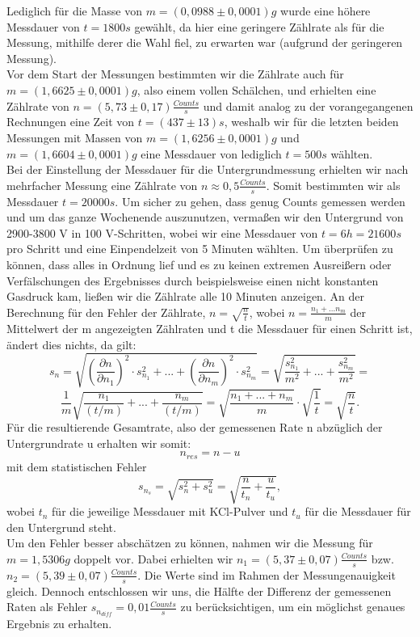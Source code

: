 Lediglich für die Masse von $m=(0,0988\pm0,0001)g$ wurde eine höhere Messdauer von $t=1800 s$ gewählt, da hier eine geringere Zählrate als für die Messung, mithilfe derer die Wahl fiel, zu erwarten war (aufgrund der geringeren Messung). \\
Vor dem Start der Messungen bestimmten wir die Zählrate auch für $m=(1,6625\pm0,0001)g$, also einem vollen Schälchen, und erhielten  eine Zählrate von $n=(5,73\pm0,17)\frac{Counts}{s}$ und damit analog zu der vorangegangenen Rechnungen eine Zeit von $t=(437\pm13)s$, weshalb wir für die letzten beiden Messungen mit Massen von $m=(1,6256\pm0,0001)g$ und $m=(1,6604\pm0,0001)g$ eine Messdauer von lediglich $t=500s$ wählten. \\
Bei der Einstellung der Messdauer für die Untergrundmessung erhielten wir nach mehrfacher Messung eine Zählrate von $n\approx 0,5 \frac{Counts}{s}$. Somit bestimmten wir als Messdauer $t=20000s$. Um sicher zu gehen, dass genug Counts gemessen werden und um das ganze Wochenende auszunutzen, vermaßen wir den Untergrund von 2900-3800 V in 100 V-Schritten, wobei wir eine Messdauer von $t=6h=21600s$ pro Schritt und eine Einpendelzeit von 5 Minuten wählten. Um überprüfen zu können, dass alles in Ordnung lief und es zu keinen extremen Ausreißern oder Verfälschungen des Ergebnisses durch beispielsweise einen nicht konstanten Gasdruck kam, ließen wir die Zählrate alle 10 Minuten anzeigen. An der Berechnung für den Fehler der Zählrate, $n=\sqrt{\frac{n}{t}}$, wobei $n=\frac{n_{1}+...n_{m}}{m}$ der Mittelwert der m angezeigten Zählraten und t die Messdauer für einen Schritt ist, ändert dies nichts, da gilt:
 \[s_{n}=\sqrt{(\frac{\partial n}{\partial n_{1}})^{2}\cdot s_{n_{1}}^{2}+...+(\frac{\partial n}{\partial n_{m}})^{2}\cdot s_{n_{m}}^{2}}=\sqrt{\frac{s_{n_{1}}^{2}}{m^{2}}+...+\frac{s_{n_{m}}^{2}}{m^{2}}}=\]
 \[\frac{1}{m}\sqrt{\frac{n_{1}}{\left(t/m\right)}+...+\frac{n_{m}}{\left(t/m\right)}}=\sqrt{\frac{n_{1}+...+n_{m}}{m}}\cdot\sqrt{\frac{1}{t}}=\sqrt{\frac{n}{t}}.\]
 Für die resultierende Gesamtrate, also der gemessenen Rate n abzüglich der Untergrundrate u erhalten wir somit: \[n_{res}=n-u\] mit dem statistischen Fehler \[s_{n_{s}}=\sqrt{s_{n}^{2}+s_{u}^{2}}=\sqrt{\frac{n}{t_{n}}+\frac{u}{t_{u}}},\] wobei $t_{n}$ für die jeweilige Messdauer mit KCl-Pulver und $t_{u}$ für die Messdauer für den Untergrund steht.\\
 Um den Fehler besser abschätzen zu können, nahmen wir die Messung für $m=1,5306g$ doppelt vor. Dabei erhielten wir $n_{1}=(5,37\pm0,07)\frac{Counts}{s}$ bzw. $n_{2}=(5,39\pm0,07)\frac{Counts}{s}$. Die Werte sind im Rahmen der Messungenauigkeit gleich. Dennoch entschlossen wir uns, die Hälfte der Differenz der gemessenen Raten als Fehler $s_{n_{diff}}=0,01\frac{Counts}{s}$ zu berücksichtigen, um ein möglichst genaues Ergebnis zu erhalten. \\
